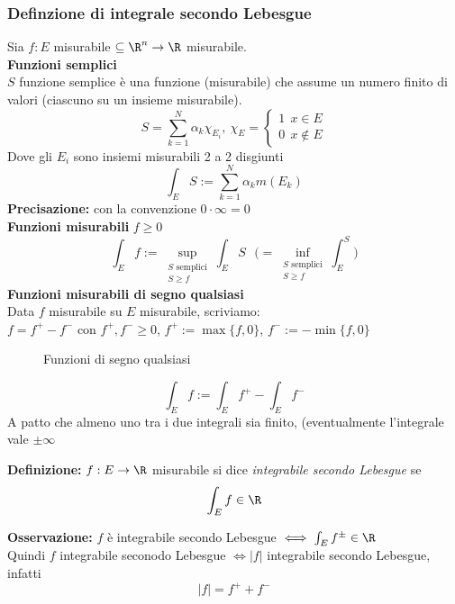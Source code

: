 \subsubsection{Definzione di integrale secondo Lebesgue}
Sia $f:E$ misurabile $\subseteq\R^n\to \R$ misurabile.
\\\textbf{Funzioni semplici}
\\$S$ funzione semplice è una funzione (misurabile) che assume un numero finito di valori (ciascuno su un insieme misurabile).
\[S=\sum_{k=1}^{N} \alpha_k\chi_{E_i},\ \chi_E=\begin{cases}
	1\ \ x\in E
	\\0\ \ x\not\in E
\end{cases}\]
Dove gli $E_i$ sono insiemi misurabili 2 a 2 disgiunti 
\[\int_{E}^{} S:=\sum_{k=1}^{N} \alpha_k m(E_k)\]
\textbf{Precisazione:} con la convenzione $0\cdot \infty=0$
\\\textbf{Funzioni misurabili} $f\ge 0$
\[\int_{E}^{} f:=\sup_{\substack{S \text{ semplici}\\S\ge  f}}\int_{E}^{}S\ \ \ \bigg(=\inf_{\substack{S \text{ semplici}\\S\ge f}} \int_{E}^{S}\bigg)\]
\textbf{Funzioni misurabili di segno qualsiasi}
\\Data $f$ misurabile su $E$ misurabile, scriviamo:
\\$f=f^+-f^-$ con $f^+,f^-\ge 0$, $f^+:=\max \{f,0\} $, $f^-:=-\min \{f,0\} $
\begin{figure}[ht]
    \centering
    \caption{Funzioni di segno qualsiasi}
    \label{fig:funzioni-di-segno-qualsiasi}
\end{figure}
\[\int_{E}^{} f:=\int_{E}^{} f^+-\int_{E}^{} f^-\]
A patto che almeno uno tra i due integrali sia finito, (eventualmente l'integrale vale $\pm \infty$
\begin{tcolorbox}
	\textbf{Definizione:} $f:E\to \R$ misurabile si dice \emph{integrabile secondo Lebesgue} se
	\[\int_{E}^{} f\in\R\] 
\end{tcolorbox}
\textbf{Osservazione:} $f$ è integrabile secondo Lebesgue $\iff \int_{E}^{} f^{\pm}\in\R $
\\Quindi $f$ integrabile seconodo Lebesgue $\iff|f|$ integrabile secondo Lebesgue, infatti
\[|f|=f^++f^-\]
